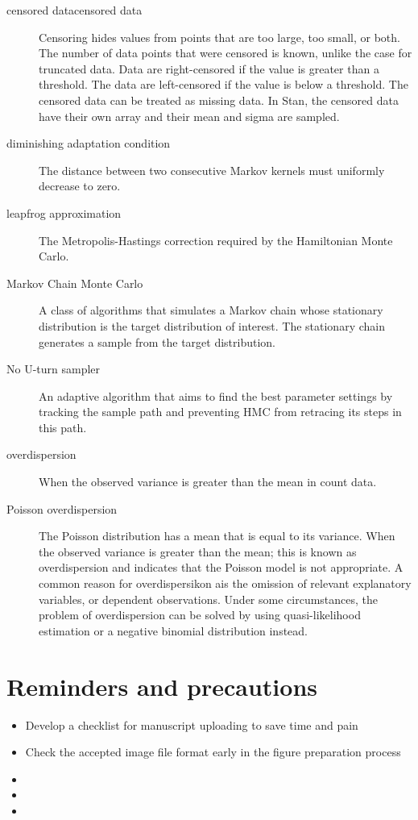 \documentclass[11pt,letterpaper]{article}
\begin{document}
\begin{description}
\item [censored datacensored data] Censoring hides values from points that are too large, too small, or both. The number of data points that were censored is known, unlike the case for truncated data. Data are right-censored if the value is greater than a threshold. The data are left-censored if the value is below a threshold. The censored data can be treated as missing data. In Stan, the censored data have their own array and their mean and sigma are sampled.
\item [diminishing adaptation condition] The distance between two consecutive Markov kernels must uniformly decrease to zero.
\item [leapfrog approximation] The Metropolis-Hastings correction required by the Hamiltonian Monte Carlo.
\item [Markov Chain Monte Carlo] A class of algorithms that simulates a Markov chain whose stationary distribution is the target distribution of interest. The stationary chain generates a sample from the target distribution.
\item [No U-turn sampler] An adaptive algorithm that aims to find the best parameter settings by tracking the sample path and preventing HMC from retracing its steps in this path.
\item [overdispersion] When the observed variance is greater than the mean in count data.
\item [Poisson overdispersion] The Poisson distribution has a mean that is equal to its variance. When the observed variance is greater than the mean; this is known as overdispersion and indicates that the Poisson model is not appropriate. A common reason for overdispersikon ais the omission of relevant explanatory variables, or dependent observations. Under some circumstances, the problem of overdispersion can be solved by using quasi-likelihood estimation or a negative binomial distribution instead.
\end{description}


\section{Reminders and precautions}
\label{sec:orgda0ffc1}


\begin{itemize}
\item Develop a checklist for manuscript uploading to save time and pain
\item Check the accepted image file format early in the figure preparation process
\item 

\item 

\item 
\end{itemize}



\printindex
\end{document}
